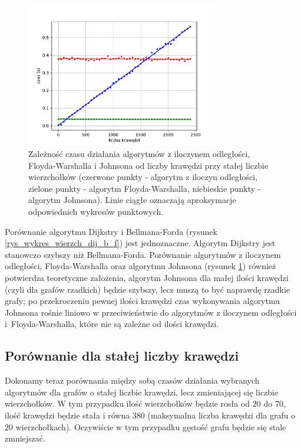 \documentclass[12pt,a4paper]{book}
\theoremstyle{definition}
\numberwithin{equation}{chapter}
\begin{document}
\begin{figure}[H]
\centering
\includegraphics[width=0.75\textwidth]{images/Wykres_stale_wierzcholki_Matrix_Floyd_Warshall_Johnson.pdf}
\caption{Zależność czasu działania algorytmów z iloczynem odległości, Floyda-Warshalla i Johnsona od liczby krawędzi przy stałej liczbie wierzchołków (czerwone punkty - algorytm z  iloczyn odległości, zielone punkty - algorytm Floyda-Warshalla, niebieskie punkty - algorytm Johnsona). Linie ciągłe oznaczają aproksymacje odpowiednich wykresów punktowych.}
\label{rys_wykres_wierzch_mm_fw_j}
\end{figure}

Porównanie algorytmu Dijkstry i Bellmana-Forda (rysunek \ref{rys_wykres_wierzch_dij_b_f}) jest jednoznaczne. Algorytm Dijkstry jest stanowczo szybszy niż Bellmana-Forda. Porównanie algorytmów z iloczynem odległości, Floyda-Warshalla oraz algorytmu Johnsona (rysunek \ref{rys_wykres_wierzch_mm_fw_j}) również potwierdza teoretyczne założenia, algorytm Johnsona dla małej ilości krawędzi (czyli dla grafów rzadkich) będzie szybszy, lecz muszą to być naprawdę rzadkie grafy; po przekroczeniu pewnej ilości krawędzi czas wykonywania algorytmu Johnsona rośnie liniowo w przeciwieństwie do algorytmów z iloczynem odległości i~Floyda-Warshalla, które nie są zależne od ilości krawędzi.



\subsection*{Porównanie dla stałej liczby krawędzi}

Dokonamy teraz porównania między sobą czasów działania wybranych algorytmów dla grafów o stałej liczbie krawędzi, lecz zmieniającej się liczbie wierzchołków. W tym przypadku ilość wierzchołków będzie rosła od $20$ do $70$, ilość krawędzi będzie stała i równa $380$ (maksymalna liczba krawędzi dla grafu o $20$ wierzchołkach). Oczywiście w tym przypadku gęstość grafu będzie się  stale zmniejszać.
\end{document}
